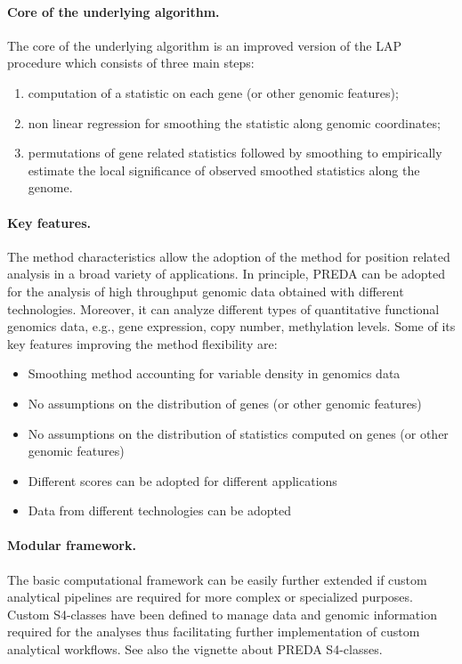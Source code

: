 \documentclass[a4paper,10pt]{article}
\begin{document}
\paragraph{Core of the underlying algorithm.} The core of the underlying algorithm is an improved version of the LAP procedure \cite{PubMed_16951291} which consists of three main steps:
\begin{enumerate}
 \item computation of a statistic on each gene (or other genomic features);
 \item non linear regression for smoothing the statistic along genomic coordinates;
 \item permutations of gene related statistics followed by smoothing to empirically estimate the local significance of observed smoothed statistics along the genome.
\end{enumerate}



\paragraph{Key features.} The method characteristics allow the adoption of the method for position related analysis in a broad variety of applications. In principle, PREDA can be adopted for the analysis of high throughput genomic data obtained with different technologies. Moreover, it can analyze different types of quantitative functional genomics data, e.g., gene expression, copy number, methylation levels. Some of its key features improving the method flexibility are:
\begin{itemize}
 \item Smoothing method accounting for variable density in genomics data
 \item No assumptions on the distribution of genes (or other genomic features)
 \item No assumptions on the distribution of statistics computed on genes (or other genomic features)
 \item Different scores can be adopted for different applications
 \item Data from different technologies can be adopted
\end{itemize}


\paragraph{Modular framework.} The basic computational framework can be easily further extended if custom analytical pipelines are required for more complex or specialized purposes. Custom S4-classes have been defined to manage data and genomic information required for the analyses thus facilitating further implementation of custom analytical workflows. See also the vignette about PREDA S4-classes.
\end{document}
